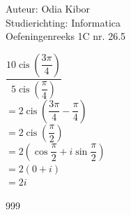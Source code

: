 \documentclass[a4paper]{article}
\begin{document}
  
\noindent \large Auteur: Odia Kibor \\
\noindent \large Studierichting: Informatica\\
\noindent \large Oefeningenreeks 1C nr. 26.5\\

\medskip

\normalsize

$ \dfrac{10\operatorname{cis} \left(\dfrac{3\pi}{4}\right)}{5\operatorname{cis} \left(\dfrac{\pi}{4}\right)}$\\

$ = 2 \operatorname{cis}\left(\dfrac{3\pi}{4} - \dfrac{\pi}{4}\right )$\\

$ = 2 \operatorname{cis}\left(\dfrac{\pi}{2} \right)$ \\

$ = 2 \left( \cos \dfrac{\pi}{2} + i \sin \dfrac{\pi}{2} \right) $ \\

$ = 2 (0 + i)$ \\

$ = 2i$ \\









\begin{thebibliography}{999}
\end{thebibliography}
\end{document}

